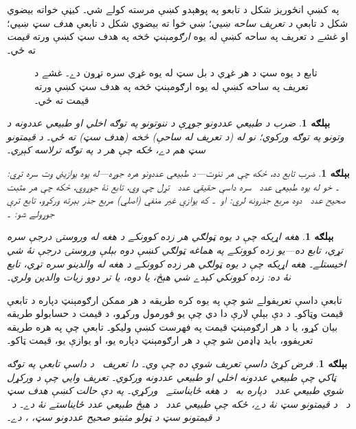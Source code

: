 \documentclass[12pt,a4paper,oneside]{report}
\newcommand{\Nat}{\mathbb{N}}
\newcommand{\Int}{\mathbb{Z}}
\newcommand{\Real}{\mathbb{R}}
\newcommand{\ollabel}[1]{\label{\pspart:\pschapter:\pssection:#1}}
\newlength{\olphotowidth}
\newcommand{\olasset}[2][\olphotowidth]{\centering\begin{LTR}\centering\resizebox{#1}{!}{}\end{LTR}}
\newenvironment{explain}{}{}
\newtheorem{ex}[defn]{بېلګه}
\begin{document}
په  کښې انځوريز شکل د تابعو په پوهېدو کښې مرسته
کولے شي۔ کيڼې خواته بيضوي شکل د تابعې \emph{د تعريف ساحه} ښيي؛
ښي خوا ته بيضوي شکل د تابعې \emph{هدف سټ} ښيي؛ او غشے د تعريف
په ساحه کښې له يوه \emph{ارګومېنټ} څخه په هدف سټ کښې ورته
\emph{قيمت} ته ځي۔

\begin{figure}
  \olasset{assets/diagrams/function.tikz}
  \caption{تابع د يوه سټ د هر غړي د بل سټ له
    يوه غړي سره تړون دے۔ غشے د تعريف په ساحه کښې
    له يوه ارګومېنټ څخه په هدف سټ کښې ورته قيمت ته ځي۔}
  \ollabel{fig:function}
\end{figure}

\begin{ex}
ضرب د طبيعي عددونو جوړې د ننوتونو په توګه اخلي او طبيعي عددونه
د وتونو په توګه ورکوي؛ نو له \LR{$\Nat \times \Nat$} (د تعريف له ساحې)
څخه \LR{$\Nat$} (هدف سټ) ته ځي۔ د قيمتونو سټ هم \LR{$\Nat$} دے، ځکه چې
هر \LR{$n \in \Nat$} د  په توګه ترلاسه کېږي۔
\end{ex}

\begin{ex}
ضرب تابع ده، ځکه چې هر ننوت---د طبيعي عددونو هره جوړه---له يوه
يوازيني وت سره تړي: \LR{$\times \colon \Nat^2 \to \Nat$}۔ خو له يوه
طبيعي عدد~ سره داسې حقيقي عدد~ تړل چې  وي،
تابع نۀ جوړوي، ځکه چې هر مثبت صحيح عدد~ دوه مربع جذرونه لري:
 او~۔ که يوازې غير منفي (اصلي) مربع جذر بېرته ورکړو،
تابع ترې جوړولے شو: \LR{$\sqrt{\phantom{X}} \colon \Nat \to \Real$}۔
\end{ex}

\begin{ex}
هغه اړيکه چې د يوه ټولګي هر زده کوونکے د هغه له وروستۍ درجې سره
تړي، تابع ده---يو زده کوونکے په هماغه ټولګي کښې دوه بېلې وروستۍ
درجې نۀ شي اخيستلے۔ هغه اړيکه چې د يوه ټولګي هر زده کوونکے
د هغه له والدينو سره تړي، تابع نۀ ده: زده کوونکي کېدے شي هېڅ،
يا دوه، يا تر دوو زيات والدين ولري۔
\end{ex}

\begin{explain}
تابعې داسې تعريفولے شو چې په يوه کره طريقه د هر ممکن ارګومېنټ
دپاره د تابعې قيمت وټاکو۔ د دې بېلې لارې دا دي چې يو فورمول
ورکړو، د قيمت د حسابولو طريقه بيان کړو، يا د هر ارګومېنټ قيمت
په فهرست کښې وليکو۔ تابعې چې په هره طريقه تعريفوو، بايد ډاډمن
شو چې د هر ارګومېنټ دپاره يو، او يوازې يو، قيمت ټاکو۔
\end{explain}


\begin{ex}
فرض کړئ \LR{$f \colon \Nat \to \Nat$} داسې تعريف شوې ده چې 
وي۔ دا تعريف~ د داسې تابعې په توګه ټاکي چې طبيعي عددونه اخلي
او طبيعي عددونه ورکوي۔ تعريف وايي چې د ورکړل شوي طبيعي عدد~
دپاره به~ د هغه ځايناستے~ ورکړي۔ په دې حالت کښې هدف
سټ \LR{$\Nat$} د~ د قيمتونو سټ نۀ دے، ځکه چې طبيعي عدد~ د
هېڅ طبيعي عدد ځايناستے نۀ دے۔ د~ د قيمتونو سټ د ټولو مثبتو
صحيح عددونو سټ، \LR{$\Int^{+}$}، دے۔
\end{ex}
\end{document}
